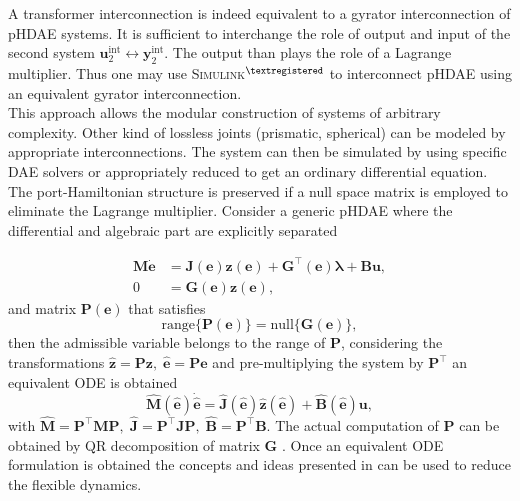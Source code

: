 \documentclass{svjour3}                     %
\begin{document}
A transformer interconnection is indeed equivalent to a gyrator interconnection of pHDAE systems. It is sufficient to interchange the role of output and input of the second system $\bm{u}_2^{\text{int}} \leftrightarrow \bm{y}_2^{\text{int}}$. The output than plays the role of a Lagrange multiplier.  Thus one may use \textsc{Simulink}$^{\tiny{\textregistered}}$ to interconnect pHDAE using an equivalent gyrator interconnection. \\
 
This approach allows the modular construction of systems of arbitrary complexity. Other kind of lossless joints (prismatic, spherical) can be modeled by appropriate interconnections. The system can then be simulated by using specific DAE solvers \cite{daePetzold} or appropriately reduced to get an ordinary differential equation. The port-Hamiltonian structure is preserved if a null space matrix is employed to eliminate the Lagrange multiplier. Consider a generic pHDAE where the differential and algebraic part are explicitly separated

\begin{equation}
\begin{aligned}
\bm{M} \dot{\bm{e}} &=  \bm{J}(\bm{e})\bm{z}(\bm{e}) + \bm{G}^\top(\bm{e}) \bm{\lambda} + \bm{B}\bm{u}, \\ 
0 &= \bm{G}(\bm{e})\bm{z}(\bm{e}),
\end{aligned}
\end{equation}
and matrix $\bm{P}(\bm{e})$ that satisfies 
\[
\mathrm{range}\{\bm{P}(\bm{e})\} = \mathrm{null}\{\bm{G}(\bm{e})\},
\]
then the admissible variable belongs to the range of $\bm{P}$, considering the transformations $\widehat{\bm{z}} = \bm{P} \bm{z}, \; \widehat{\bm{e}} = \bm{P} \bm{e}$ and pre-multiplying the system by $\bm{P}^\top$ an equivalent ODE is obtained
\[
\widehat{\bm{M}}(\widehat{\bm{e}}) \dot{\widehat{\bm{e}}} =  \widehat{\bm{J}}(\widehat{\bm{e}})\widehat{\bm{z}}(\widehat{\bm{e}}) + \widehat{\bm{B}}(\widehat{\bm{e}})\bm{u},
\]
with $\widehat{\bm{M}} = \bm{P}^\top \bm{M} \bm{P}, \; \widehat{\bm{J}} = \bm{P}^\top \bm{J} \bm{P}, \; \widehat{\bm{B}} = \bm{P}^\top \bm{B}$. The actual computation of $\bm{P}$ can be obtained by QR decomposition of matrix $\bm{G}$ \cite{nullspaceFlMult}. Once an equivalent ODE formulation is obtained the concepts and ideas presented in \cite{phode_red} can be used to reduce the flexible dynamics.
\end{document}
